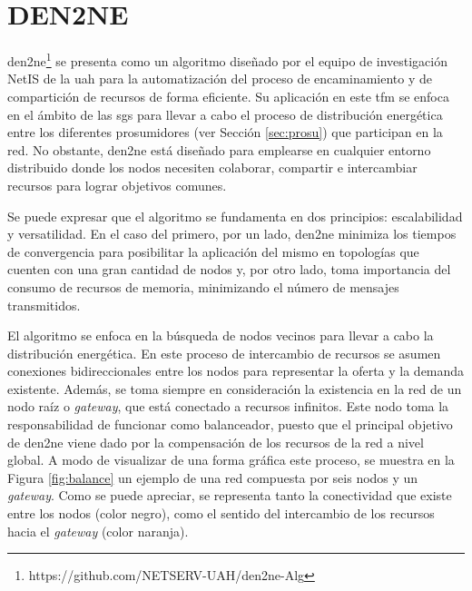 \section{DEN2NE}
\label{sec:den2ne}

\acrfull{den2ne}\footnote{https://github.com/NETSERV-UAH/den2ne-Alg} \cite{den2ne} \cite{gitden2ne} se presenta como un algoritmo diseñado por el equipo de investigación NetIS de la \gls{uah} para la automatización del proceso de encaminamiento y de compartición de recursos de forma eficiente. Su aplicación en este \gls{tfm} se enfoca en el ámbito de las \gls{sg}s para llevar a cabo el proceso de distribución energética entre los diferentes prosumidores (ver Sección \ref{sec:prosu}) que participan en la red. No obstante, \gls{den2ne} está diseñado para emplearse en cualquier entorno distribuido donde los nodos necesiten colaborar, compartir e intercambiar recursos para lograr objetivos comunes.

\vspace{3mm} 

Se puede expresar que el algoritmo se fundamenta en dos principios: escalabilidad y versatilidad. En el caso del primero, por un lado, \gls{den2ne} minimiza los tiempos de convergencia para posibilitar la aplicación del mismo en topologías que cuenten con una gran cantidad de nodos y, por otro lado, toma importancia del consumo de recursos de memoria, minimizando el número de mensajes transmitidos. 

\vspace{3mm}

El algoritmo se enfoca en la búsqueda de nodos vecinos para llevar a cabo la distribución energética. En este proceso de intercambio de recursos se asumen conexiones bidireccionales entre los nodos para representar la oferta y la demanda existente. Además, se toma siempre en consideración la existencia en la red de un nodo raíz o \textit{gateway}, que está conectado a recursos infinitos. Este nodo toma la responsabilidad de funcionar como balanceador, puesto que el principal objetivo de \gls{den2ne} viene dado por la compensación de los recursos de la red a nivel global. A modo de visualizar de una forma gráfica este proceso, se muestra en la Figura \ref{fig:balance} un ejemplo de una red compuesta por seis nodos y un \textit{gateway}. Como se puede apreciar, se representa tanto la conectividad que existe entre los nodos (color negro), como el sentido del intercambio de los recursos hacia el \textit{gateway} (color naranja). 

